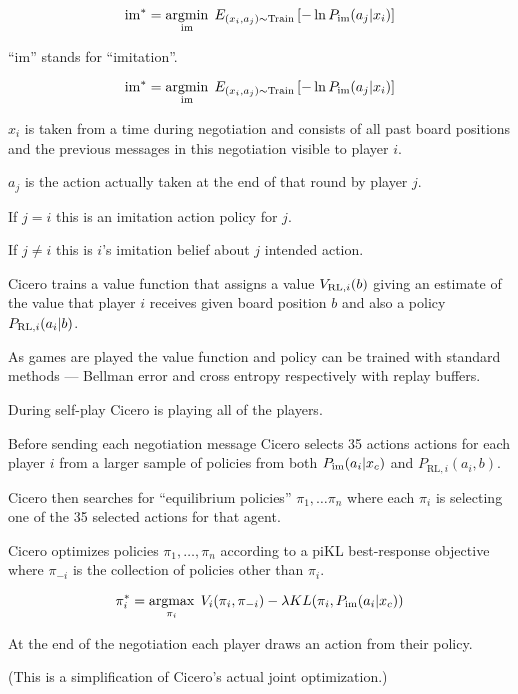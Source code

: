 {\vfill
$$\mathrm{im}^* = \operatorname*{argmin}_{\mathrm{im}}\;E_{(x_i,a_j) \sim \mathrm{Train}}\left[-\ln P_{\mathrm{im}}(a_j|x_i)\right]$$

\vfill
``im'' stands for ``imitation''.


$$\mathrm{im}^* = \operatorname*{argmin}_{\mathrm{im}}\;E_{(x_i,a_j) \sim \mathrm{Train}}\left[-\ln P_{\mathrm{im}}(a_j|x_i)\right]$$

\vfill
$x_i$ is taken from a time during negotiation and
consists of all past board positions and the previous messages in this negotiation visible to player $i$.

\vfill
$a_j$ is the action actually taken at the end of that round by player $j$.

\vfill
If $j = i$ this is an imitation action policy for $j$.

\vfill
If $j \ne i$ this is $i$'s imitation belief about $j$ intended action.



Cicero trains a value function that assigns a value $V_{\mathrm{RL},i}(b)$ giving an estimate of the value that player $i$ receives 
given board position $b$ and also a policy $P_{\mathrm{RL},i}(a_i|b)$.

\vfill
As games are played the value function and policy can be trained with standard methods --- Bellman error and cross entropy respectively
with replay buffers.


During self-play Cicero is playing all of the players.

\vfill
Before sending each negotiation message Cicero selects 35 actions actions for each player $i$
from a larger sample of policies from both $P_{\mathrm{im}}(a_i|x_c)$ and $P_{\mathrm{RL},i}(a_i,b)$.

\vfill
Cicero then searches for ``equilibrium policies'' $\pi_1,\ldots \pi_n$ where each $\pi_i$ is selecting one of the 35 selected actions for that agent.


Cicero optimizes policies $\pi_1,\ldots,\pi_n$ according to a piKL best-response objective
where $\pi_{-i}$ is the collection of policies other than $\pi_i$.

\vfill
$$\pi_i^* = \operatorname*{argmax}_{\pi_i}\;V_i(\pi_i,\pi_{-i}) - \lambda KL(\pi_i,P_{\mathrm{im}}(a_i|x_c))$$

\vfill
At the end of the negotiation each player draws an action from their policy.

\vfill
(This is a simplification of Cicero's actual joint optimization.)

}

